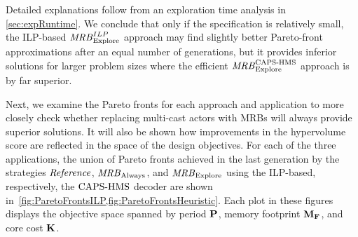 \begin{table*}[th]
{\begin{tabular}{|l | r r r| r r r | r r r |}
	\end{tabular} }
\end{table*}
Detailed explanations follow from an exploration time analysis in \cref{sec:expRuntime}.
We conclude that only if the specification is relatively small, the ILP-based ${\it MRB}_{\mathrm{Explore}}^{ILP}$ approach may find slightly better Pareto-front approximations after an equal number of generations, but it provides inferior solutions for larger problem sizes where the efficient ${\it MRB}_{\mathrm{Explore}}^{\textup{{CAPS-HMS}}}$ approach is by far superior.
\par
Next, we examine the Pareto fronts for each approach and application to more closely check whether replacing multi-cast actors with \acp{MRB} will always provide superior solutions.
It will also be shown how improvements in the hypervolume score are reflected in the space of the design objectives.
For each of the three applications, the union of Pareto fronts achieved in the last generation by the strategies ${\it Reference}$, ${\it MRB}_{\mathrm{Always}}$, and ${\it MRB}_{\mathrm{Explore}}$ using the \ac{ILP}-based, respectively, the $\textup{{CAPS-HMS}}$ decoder are shown in~\cref{fig:ParetoFrontsILP,fig:ParetoFrontsHeuristic}.
Each plot in these figures displays the objective space spanned by period $\mathbf{P}$, memory footprint $\mathbf{M_F}$, and core cost $\mathbf{K}$.
